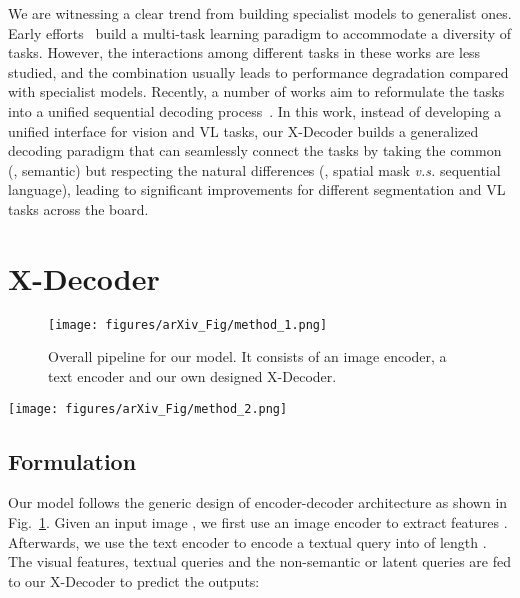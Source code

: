 \documentclass[10pt,twocolumn,letterpaper]{article}
\newcommand{\ourmodel}{X-Decoder}
\begin{document}
We are witnessing 
a clear trend from building specialist models to generalist ones. 
Early efforts~\cite{hu2021unit,gupta2022towards} build a multi-task learning paradigm to accommodate a diversity of tasks. 
However, the interactions among different tasks in these works are less studied, and the combination usually leads to performance degradation compared with specialist models. Recently, 
a number of works aim to reformulate the tasks into a unified sequential decoding process~\cite{chen2022unified,yang2022unitab,wang2022ofa,lu2022unified,kolesnikov2022uvim}. In this work, instead of developing a unified interface for vision and VL tasks, our \ourmodel{} builds a generalized decoding paradigm that can seamlessly connect the tasks by taking the common (\eg, semantic) but respecting the natural differences (\eg, spatial mask \textit{v.s.} sequential language), leading to significant improvements for different segmentation and VL tasks across the board. \section{X-Decoder}
\begin{figure}
    \centering
    \texttt{[image: figures/arXiv\_Fig/method\_1.png]}
    \caption{Overall pipeline for our model. It consists of an image encoder, a text encoder and our own designed \ourmodel{}.}
    \label{fig:xdecoder_overall}
\end{figure}

\begin{figure*}[t]
    \centering
    \texttt{[image: figures/arXiv\_Fig/method\_2.png]}
    \caption{Unifying four different types of tasks with our proposed \ourmodel{}. From left to right, they are: (a) generic semantic/instance/panoptic segmentation; (b) referring segmentation; (c) image-text retrieval and (d) image captioning and VQA. The components with white text indicate not applied.}
    \label{fig:task_unification}
\end{figure*}

\subsection{Formulation}

Our model follows the generic design of encoder-decoder architecture as shown in Fig.~\ref{fig:xdecoder_overall}. Given an input image , we first use an image encoder  to extract features . Afterwards, we use the text encoder  to encode a textual query  into {} of length . The visual features, textual queries and the  non-semantic or latent queries {} are fed to our \ourmodel{} to predict the outputs:
\end{document}
